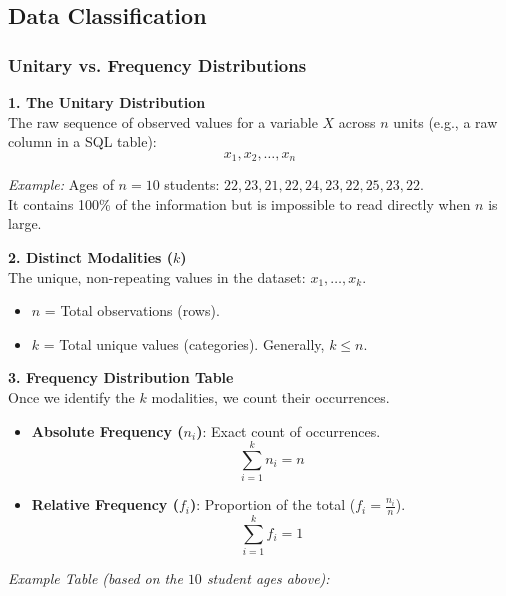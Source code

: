 \subsection{Data Classification}

\subsubsection{Unitary vs. Frequency Distributions}

\textbf{1. The Unitary Distribution}\\
The raw sequence of observed values for a variable $X$ across $n$ units (e.g., a raw column in a SQL table):
$$x_1, x_2, \ldots, x_n$$

\textit{Example:} Ages of $n=10$ students: $22, 23, 21, 22, 24, 23, 22, 25, 23, 22$. \\
It contains 100\% of the information but is impossible to read directly when $n$ is large.

\vspace{0.3cm}
\textbf{2. Distinct Modalities ($k$)}\\
The unique, non-repeating values in the dataset: $x_1, \ldots, x_k$.
\begin{itemize}
    \item $n$ = Total observations (rows).
    \item $k$ = Total unique values (categories). Generally, $k \leq n$.
\end{itemize}

\vspace{0.3cm}
\textbf{3. Frequency Distribution Table}\\
Once we identify the $k$ modalities, we count their occurrences.

\begin{itemize}
    \item \textbf{Absolute Frequency ($n_i$)}: Exact count of occurrences. 
    $$\sum_{i=1}^{k} n_i = n$$
    \item \textbf{Relative Frequency ($f_i$)}: Proportion of the total ($f_i = \frac{n_i}{n}$). 
    $$\sum_{i=1}^{k} f_i = 1$$
\end{itemize}

\vspace{0.2cm}
\textit{Example Table (based on the $10$ student ages above):}

